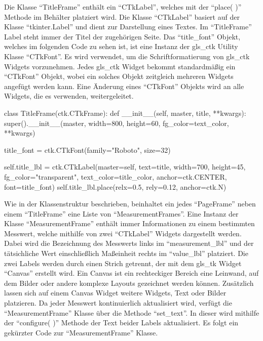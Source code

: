 Die Klasse \enquote{TitleFrame} enthält ein \enquote{CTkLabel}, welches mit der \enquote{place( )} Methode im Behälter platziert wird. Die Klasse \enquote{CTkLabel} basiert auf der Klasse \enquote{tkinter.Label} und dient zur Darstellung eines Textes. Im \enquote{TitleFrame} Label steht immer der Titel der zugehörigen Seite. Das \enquote{title\_font} Objekt, welches im folgenden Code zu sehen ist, ist eine Instanz der \gls{gls_ctk} Utility Klasse \enquote{CTkFont}. Es wird verwendet, um die Schriftformatierung von \gls{gls_ctk} Widgets vorzunehmen. Jedes \gls{gls_ctk} Widget bekommt standardmäßig ein \enquote{CTkFont} Objekt, wobei ein solches Objekt zeitgleich mehreren Widgets angefügt werden kann. Eine Änderung eines \enquote{CTkFont} Objekts wird an alle Widgets, die es verwenden, weitergeleitet. \cite[vgl.][]{Schimansky:o.J.}

\begin{pythoncode}
class TitleFrame(ctk.CTkFrame):
	def __init__(self, master, title, **kwargs):
		super().__init__(master, width=800, height=60, fg_color=text_color, **kwargs)
		
		title_font = ctk.CTkFont(family="Roboto", size=32)
		
		self.title_lbl = ctk.CTkLabel(master=self, text=title, width=700, height=45, fg_color="transparent", text_color=title_color, anchor=ctk.CENTER, font=title_font)
		self.title_lbl.place(relx=0.5, rely=0.12, anchor=ctk.N)
\end{pythoncode}

Wie in der Klassenstruktur beschrieben, beinhaltet ein jedes \enquote{PageFrame} neben einem \enquote{TitleFrame} eine Liste von \enquote{MeasurementFrames}. Eine Instanz der Klasse \enquote{MeasurementFrame} enthält immer Informationen zu einem bestimmten Messwert, welche mithilfe von zwei \enquote{CTkLabel} Widgets dargestellt werden. Dabei wird die Bezeichnung des Messwerts links im \enquote{measurement\_lbl} und der tätsichliche Wert einschließlich Maßeinheit rechts im \enquote{value\_lbl} platziert. Die zwei Labels werden durch einen Strich getrennt, der mit dem \gls{gls_tk} Widget \enquote{Canvas} erstellt wird. Ein Canvas ist ein rechteckiger Bereich \bzw eine Leinwand, auf dem Bilder oder andere komplexe Layouts gezeichnet werden können. Zusätzlich lassen sich auf einem Canvas Widget \zB weitere Widgets, Text oder Bilder platzieren. \cite[vgl.][20]{Shipman:2013} 
\newline Da jeder Messwert kontinuierlich aktualisiert wird, verfügt die \enquote{MeasurementFrame} Klasse über die Methode \enquote{set\_text}. In dieser wird mithilfe der \enquote{configure( )} Methode der Text beider Labels aktualisiert. Es folgt ein gekürzter Code zur \enquote{MeasurementFrame} Klasse.

